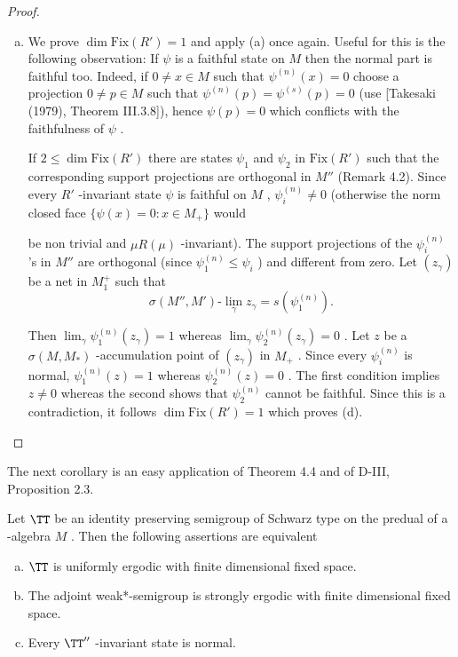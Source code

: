\begin{proof}
\begin{enumerate}[(a), wide]
\item
We prove $ \dim \text{Fix}(R') = 1 $  and apply (a) once again.
Useful for this is the following observation: If $ \psi $  is a faithful state on $ M $  then the normal part is faithful too.
Indeed, if $ 0 \neq x \in M $  such that $ \psi^{(n)}(x) = 0 $  choose a projection $ 0 \neq p \in M $  such that $ \psi^{(n)}(p) = \psi^{(s)}(p) = 0 $  (use [Takesaki (1979), Theorem III.3.8]), hence $ \psi(p) = 0 $  which conflicts with the faithfulness of $ \psi $ .

If $ 2 \leq \dim \text{Fix}(R') $  there are states $ \psi_{1} $  and $ \psi_{2} $  in $ \text{Fix}(R') $  such that the corresponding support projections are orthogonal in $ M'' $  (Remark 4.2).
Since every $ R' $ -invariant state $ \psi $  is faithful on $ M $ , $ \psi_{i}^{(n)} \neq 0 $  (otherwise the norm closed face $ \{\psi(x) = 0: x \in M_{+}\} $  would

\newpage

be non trivial and $ \mu R(\mu) $ -invariant).
The support projections of the $ \psi_{i}^{(n)} $ 's in $ M'' $  are orthogonal (since $ \psi_{1}^{(n)} \leq \psi_{i} $ ) and different from zero.
Let $ (z_{\gamma}) $  be a net in $ M_{1}^{+} $  such that
\[
\sigma(M'',M')\text{-}\lim_{\gamma} z_{\gamma} = s(\psi_{1}^{(n)}).
\]

Then $ \lim_{\gamma} \psi_{1}^{(n)}(z_{\gamma}) = 1 $  whereas $ \lim_{\gamma} \psi_{2}^{(n)}(z_{\gamma}) = 0 $ .
Let $ z $  be a $ \sigma(M,M_{*}) $ -accumulation point of $ (z_{\gamma}) $  in $ M_{+} $ .
Since every $ \psi_{i}^{(n)} $  is normal, $ \psi_{1}^{(n)}(z) = 1 $  whereas $ \psi_{2}^{(n)}(z) = 0 $ .
The first condition implies $ z \neq 0 $  whereas the second shows that $ \psi_{2}^{(n)} $  cannot be faithful.
Since this is a contradiction, it follows $ \dim \text{Fix}(R') = 1 $  which proves (d).
\end{enumerate}
\end{proof}

The next corollary is an easy application of Theorem 4.4 and of D-III, Proposition 2.3.

\begin{corollary}\label{cor:d4-4.5}
Let $ \TT $  be an identity preserving semigroup of Schwarz type on the predual of a \WA-algebra $ M $ .
Then the following assertions are equivalent

\begin{enumerate}[(a)]
\item
$ \TT $  is uniformly ergodic with finite dimensional fixed space.

\item
The adjoint weak*-semigroup is strongly ergodic with finite dimensional fixed space.

\item
Every $ \TT'' $ -invariant state is normal.
\end{enumerate}
\end{corollary}

